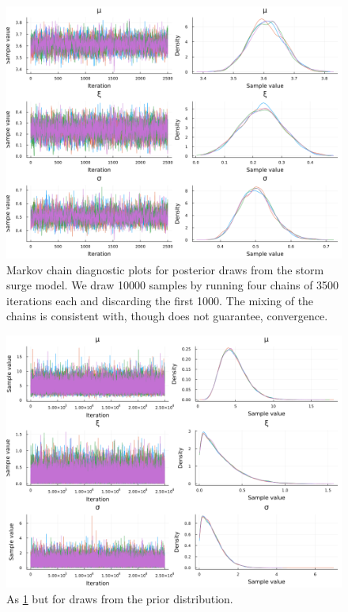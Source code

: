 \documentclass[11pt]{article}
\begin{document}
\begin{figure}
    \centering
    \includegraphics[width=\textwidth]{surge-posterior-chains}
    \caption{
        Markov chain diagnostic plots for posterior draws from the storm surge model.
        We draw \num{10000} samples by running four chains of \num{3500} iterations each and discarding the first \num{1000}.
        The mixing of the chains is consistent with, though does not guarantee, convergence.
    }\label{fig:surge-posterior-chains}
\end{figure}

\begin{figure}
    \centering
    \includegraphics[width=\textwidth]{surge-prior-chains}
    \caption{
        As \cref{fig:surge-posterior-chains} but for draws from the prior distribution.
    }\label{fig:surge-prior-chains}
\end{figure}
\end{document}
